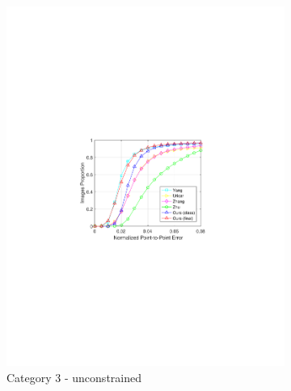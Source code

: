 \documentclass[letterpaper]{article} %
\begin{document}
\begin{figure}[t]
\begin{subfigure}[b]{0.3\textwidth}
            \includegraphics[width=\textwidth]{fig/C3Curve.pdf}
            \caption{{\small Category 3 - unconstrained}}    
            \label{fig:test4}
        \end{subfigure}
        \qquad
        \begin{subfigure}[b]{0.3\textwidth}   
            \centering

\end{subfigure}
\end{figure}
\end{document}
